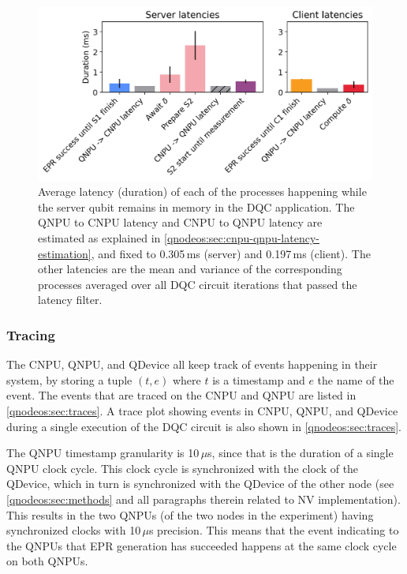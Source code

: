 \begin{figure}[htbp]
\centering
\includegraphics[width=0.8\linewidth]{figures/qnodeos/supplementary/plots/latencies_variance.png}
\caption{Average latency (duration) of each of the processes happening while the server qubit remains in memory in the \ac{DQC} application. The \ac{QNPU} to \ac{CNPU} latency and \ac{CNPU} to \ac{QNPU} latency are estimated as explained in \cref{qnodeos:sec:cnpu-qnpu-latency-estimation}, and fixed to 0.305\,ms (server) and 0.197\,ms (client). The other latencies are the mean and variance of the corresponding processes averaged over all \ac{DQC} circuit iterations that passed the latency filter.}
\label{qnodeos:fig:delcomp-latencies-variance}
\end{figure}

\subsubsection{Tracing}

The \ac{CNPU}, \ac{QNPU}, and \ac{QDevice} all keep track of events happening in their system, by storing a tuple $(t, e)$ where $t$ is a timestamp and $e$ the name of the event. The events that are traced on the \ac{CNPU} and \ac{QNPU} are listed in \cref{qnodeos:sec:traces}. A trace plot showing events in \ac{CNPU}, \ac{QNPU}, and \ac{QDevice} during a single execution of the \ac{DQC} circuit is also shown in \cref{qnodeos:sec:traces}.

The \ac{QNPU} timestamp granularity is 10\,$\mu$s, since that is the duration of a single \ac{QNPU} clock cycle. This clock cycle is synchronized with the clock of the \ac{QDevice}, which in turn is synchronized with the \ac{QDevice} of the other node (see \cref{qnodeos:sec:methods} and all paragraphs therein related to \ac{NV} implementation). This results in the two \acp{QNPU} (of the two nodes in the experiment) having synchronized clocks with 10\,$\mu$s precision. This means that the event indicating to the \acp{QNPU} that \ac{EPR} generation has succeeded happens at the same clock cycle on both \acp{QNPU}.

